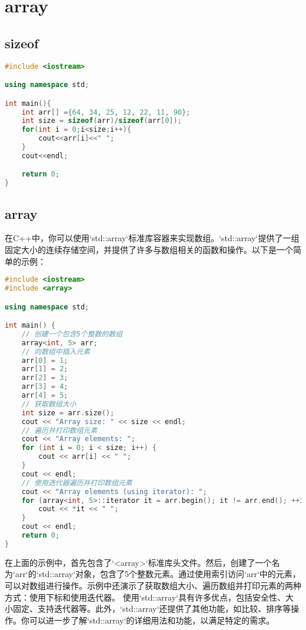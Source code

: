 \documentclass[12pt,twiside,a4paper]{ctexbook}
\numberwithin{chapter}{part}
\begin{document}
\chapter{array}
\section{sizeof}
\begin{lstlisting}[language=C++]
#include <iostream>

using namespace std;

int main(){
	int arr[] ={64, 34, 25, 12, 22, 11, 90};
	int size = sizeof(arr)/sizeof(arr[0]);
	for(int i = 0;i<size;i++){
		cout<<arr[i]<<" ";
	}
	cout<<endl;

	return 0;
}
\end{lstlisting}

\section{array}
在C++中，你可以使用`std::array`标准库容器来实现数组。`std::array`提供了一组固定大小的连续存储空间，并提供了许多与数组相关的函数和操作。以下是一个简单的示例：

\begin{lstlisting}[language=C++]
#include <iostream>
#include <array>

using namespace std;

int main() {
    // 创建一个包含5个整数的数组
    array<int, 5> arr;
    // 向数组中插入元素
    arr[0] = 1;
    arr[1] = 2;
    arr[2] = 3;
    arr[3] = 4;
    arr[4] = 5;
    // 获取数组大小
    int size = arr.size();
    cout << "Array size: " << size << endl;
    // 遍历并打印数组元素
    cout << "Array elements: ";
    for (int i = 0; i < size; i++) {
        cout << arr[i] << " ";
    }
    cout << endl;
    // 使用迭代器遍历并打印数组元素
    cout << "Array elements (using iterator): ";
    for (array<int, 5>::iterator it = arr.begin(); it != arr.end(); ++it) {
        cout << *it << " ";
    }
    cout << endl;
    return 0;
}
\end{lstlisting}
在上面的示例中，首先包含了`<array>`标准库头文件。然后，创建了一个名为`arr`的`std::array`对象，包含了5个整数元素。通过使用索引访问`arr`中的元素，可以对数组进行操作。示例中还演示了获取数组大小、遍历数组并打印元素的两种方式：使用下标和使用迭代器。
使用`std::array`具有许多优点，包括安全性、大小固定、支持迭代器等。此外，`std::array`还提供了其他功能，如比较、排序等操作。你可以进一步了解`std::array`的详细用法和功能，以满足特定的需求。
\end{document}
